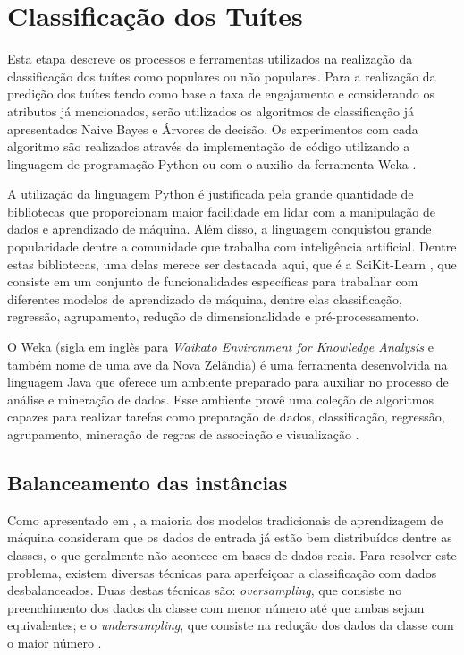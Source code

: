 \documentclass[oneside,openright,12pt]{ufsm_2015} %
\begin{document}
\section{Classificação dos Tuítes}
\label{sec:prop-classificacao}

    \par Esta etapa descreve os processos e ferramentas utilizados na realização da classificação dos tuítes como populares ou não populares. Para a realização da predição dos tuítes tendo como base a taxa de engajamento e considerando os atributos já mencionados, serão utilizados os algoritmos de classificação já apresentados Naive Bayes e Árvores de decisão. Os experimentos com cada algoritmo são realizados através da implementação de código utilizando a linguagem de programação Python \cite{site:python} ou com o auxilio da ferramenta Weka \cite{site:weka}.
    
    \par A utilização da linguagem Python é justificada pela grande quantidade de bibliotecas que proporcionam maior facilidade em lidar com a manipulação de dados e aprendizado de máquina. Além disso, a linguagem conquistou grande popularidade dentre a comunidade que trabalha com inteligência artificial. Dentre estas bibliotecas, uma delas merece ser destacada aqui, que é a SciKit-Learn \cite{site:scikit-learn}, que consiste em um conjunto de funcionalidades específicas para trabalhar com diferentes modelos de aprendizado de máquina, dentre elas classificação, regressão, agrupamento, redução de dimensionalidade e pré-processamento.
    
    \par O Weka (sigla em inglês para \textit{Waikato Environment for Knowledge Analysis} e também nome de uma ave da Nova Zelândia) é uma ferramenta desenvolvida na linguagem Java que oferece um ambiente preparado para auxiliar no processo de análise e mineração de dados. Esse ambiente provê uma coleção de algoritmos capazes para realizar tarefas como preparação de dados, classificação, regressão, agrupamento, mineração de regras de associação e visualização \cite{site:weka}.


\subsection{Balanceamento das instâncias}
\label{sec:prop-class-balanceamento}
    
    \par Como apresentado em \cite{book:han:11}, a maioria dos modelos tradicionais de aprendizagem de máquina consideram que os dados de entrada já estão bem distribuídos dentre as classes, o que geralmente não acontece em bases de dados reais. Para resolver este problema, existem diversas técnicas para aperfeiçoar a classificação com dados desbalanceados. Duas destas técnicas são: \textit{oversampling}, que consiste no preenchimento dos dados da classe com menor número até que ambas sejam equivalentes; e o \textit{undersampling}, que consiste na redução dos dados da classe com o maior número \cite{kotsiantis:2006}.
    
\end{document}
